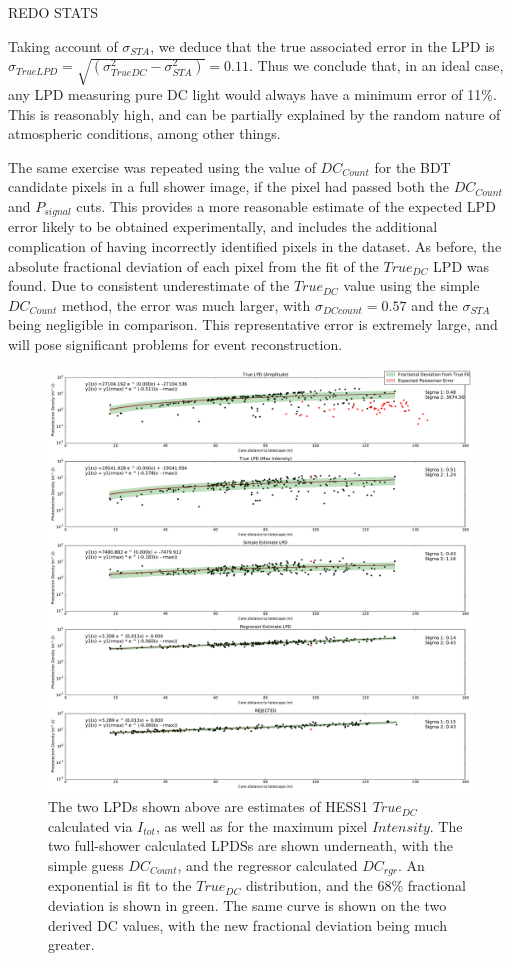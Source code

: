 \documentclass[11pt]{article}
\begin{document}
REDO STATS

Taking account of $\sigma_{STA}$, we deduce that the true associated error in the LPD is $\sigma_{TrueLPD} = \sqrt{(\sigma_{TrueDC}^{2} - \sigma_{STA}^{2})} = 0.11$. Thus we conclude that, in an ideal case, any LPD measuring pure DC light would always have a minimum error of 11\%. This is reasonably high, and can be partially explained by the random nature of atmospheric conditions, among other things.

The same exercise was repeated using the value of $DC_{Count}$ for the BDT candidate pixels in a full shower image, if the pixel had passed both the $DC_{Count}$ and $P_{signal}$ cuts. This provides a more reasonable estimate of the expected LPD error likely to be obtained experimentally, and includes the additional complication of having incorrectly identified pixels in the dataset. As before, the absolute fractional deviation of each pixel from the fit of the $True_{DC}$ LPD was found. Due to consistent underestimate of the $True_{DC}$ value using the simple $DC_{Count}$ method, the error was much larger, with $\sigma_{DCcount}=0.57$ and the $\sigma_{STA}$ being negligible in comparison. This representative error is extremely large, and will pose significant problems for event reconstruction.

\begin{figure}
\begin{center}
\includegraphics[width=\textwidth]{corsikalpd1}
\caption{The two LPDs shown above are estimates of HESS1 $True_{DC}$ calculated via $I_{tot}$, as well as for the maximum pixel $Intensity$. The two full-shower calculated LPDSs are shown underneath, with the simple guess $DC_{Count}$, and the regressor calculated $DC_{rgr}$. An exponential is fit to the $True_{DC}$ distribution, and the 68\% fractional deviation is shown in green. The same curve is shown on the two derived DC values, with the new fractional deviation being much greater.}
\label{fig:corsikalpd1}
\end{center}
\end{figure}
\end{document}
